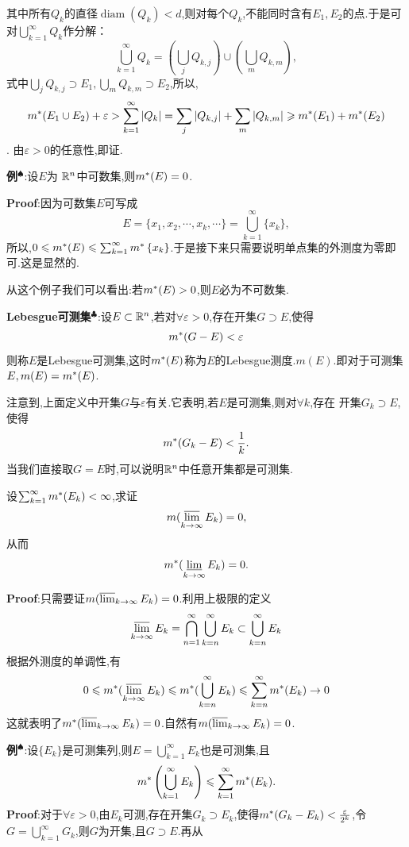 其中所有$Q_{k}$的直径$\operatorname{diam}(Q_{k})<d$,则对每个$Q_{k}$,不能同时含有$E_{1},E_{2}$的点.于是可对$\bigcup_{k=1}^{\infty}Q_{k}$作分解：  
$$
\bigcup_{k=1}^{\infty}Q_{k}=(\bigcup_{j}Q_{k,j})\cup(\bigcup_{m}Q_{k,m}),
$$  
式中$\bigcup_{j}Q_{k,j}\supset E_{1},\bigcup_{m}Q_{k,m}\supset E_{2}$,所以,
$$
m^*(E_{1}\cup E_{2})+\varepsilon>\sum_{k=1}^{\infty}|Q_{k}|=\sum_{j}|Q_{k,j}|+\sum_{m}|Q_{k,m}|\geqslant m^* (E_1)+m^* (E_2)
$$.
由$\varepsilon>0$的任意性,即证.\par
\textbf{例}$^\spadesuit$:设$E$为 $\mathbb{R} ^n$中可数集,则$m^*(E)=0$.\par
\textbf{Proof}:因为可数集$E$可写成  
$$
E=\{x_{1},x_{2},\cdots,x_{k},\cdots\}=\bigcup_{k=1}^{\infty}\{x_{k}\},
$$  
所以,$0\leqslant m^*(E)\leqslant\sum_{k=1}^{\infty}m^*\left\{x_{k}\right\}$.于是接下来只需要说明单点集的外测度为零即可.这是显然的.\par
从这个例子我们可以看出:若$m^*(E)>0$,则$E$必为不可数集.\par
\textbf{Lebesgue可测集}$^\clubsuit $:设$E\subset\mathbb{R} ^n$,若对$\forall\varepsilon>0$,存在开集$G\supset E$,使得  
$$
m^*(G-E)<\varepsilon
$$  
则称$E$是Lebesgue可测集,这时$m^*(E)$称为$E$的Lebesgue测度.$m(E)$.即对于可测集$E,m(E)=m^*(E)$.\par
注意到,上面定义中开集$G$与$\varepsilon$有关.它表明,若$E$是可测集,则对$\forall k$,存在 
开集$G_{k}\supset E$,使得  
$$
m^*(G_{k}-E)<\frac{1}{k}.
$$  
当我们直接取$G=E$时,可以说明$\mathbb{R} ^n$中任意开集都是可测集.
\begin{tcolorbox}[colback=KuangNei,colframe=BianKuang,title=\textbf{Borel-Cantelli引理},sharpish corners]
设$\sum_{k=1}^{\infty}m^*(E_{k})<\infty$,求证  
$$
m(\varlimsup_{k\to\infty}E_{k})=0,
$$  
从而  
$$
m^*(\varliminf_{k\to\infty}E_{k})=0.
$$
\end{tcolorbox}
\textbf{Proof}:只需要证$m(\varlimsup_{k\to\infty}E_{k})=0$.利用上极限的定义
$$
\varlimsup_{k\to\infty}E_{k}=\bigcap_{n=1}^{\infty}\bigcup_{k=n}^{\infty}E_{k}\subset\bigcup_{k=n}^{\infty}E_{k}
$$
根据外测度的单调性,有
$$
0\leqslant m^* (\varlimsup_{k\to\infty}E_{k})\leqslant m^*(\bigcup_{k=n}^{\infty}E_{k})\leqslant \sum_{k=n}^{\infty}m^*(E_{k})\to 0
$$
这就表明了$m^*(\varlimsup_{k\to\infty}E_{k})=0$.自然有$m(\varlimsup_{k\to\infty}E_{k})=0$.\par
\textbf{例}$^\spadesuit$:设$\{E_{k}\}$是可测集列,则$E=\bigcup_{k=1}^{\infty}E_{k}$也是可测集,且  
$$
m^*\left(\bigcup_{k=1}^{\infty}E_{k}\right)\leqslant\sum_{k=1}^{\infty}m^*(E_{k}).
$$
\qquad \textbf{Proof}:对于$\forall\varepsilon>0$,由$E_{k}$可测,存在开集$G_{k}\supset E_{k}$,使得$m^*(G_{k}-E_{k})<\frac{\varepsilon}{2^{k}}$,令$G=\bigcup_{k=1}^{\infty}G_{k}$,则$G$为开集,且$G\supset E$.再从  
